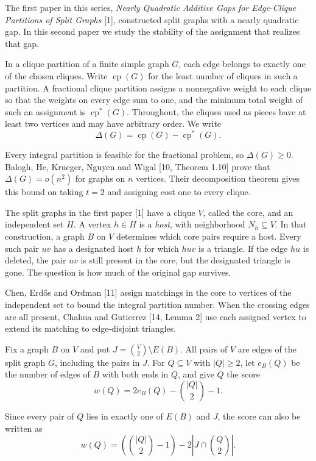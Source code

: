 \documentclass[english,11pt,a4paper]{article}
\begin{document}
The first paper in this series, \emph{Nearly Quadratic Additive Gaps for Edge-Clique Partitions of Split Graphs} {[}1{]}, constructed split graphs with a nearly quadratic gap. In this second paper we study the stability of the assignment that realizes that gap.

In a clique partition of a finite simple graph \(G\), each edge belongs to exactly one of the chosen cliques. Write \(\operatorname{cp}(G)\) for the least number of cliques in such a partition. A fractional clique partition assigns a nonnegative weight to each clique so that the weights on every edge sum to one, and the minimum total weight of such an assignment is \(\operatorname{cp}^{\ast}(G)\). Throughout, the cliques used as pieces have at least two vertices and may have arbitrary order. We write
\[
\Delta(G)=\operatorname{cp}(G)-\operatorname{cp}^{\ast}(G).
\]

Every integral partition is feasible for the fractional problem, so \(\Delta(G)\ge0\). Balogh, He, Krueger, Nguyen and Wigal {[}10, Theorem 1.10{]} prove that \(\Delta(G)=o(n^2)\) for graphs on \(n\) vertices. Their decomposition theorem gives this bound on taking \(t=2\) and assigning cost one to every clique.

The split graphs in the first paper {[}1{]} have a clique \(V\), called the core, and an independent set \(H\). A vertex \(h\in H\) is a \emph{host}, with neighborhood \(N_h\subseteq V\). In that construction, a graph \(B\) on \(V\) determines which core pairs require a host. Every such pair \(uv\) has a designated host \(h\) for which \(huv\) is a triangle. If the edge \(hu\) is deleted, the pair \(uv\) is still present in the core, but the designated triangle is gone. The question is how much of the original gap survives.

Chen, Erdős and Ordman {[}11{]} assign matchings in the core to vertices of the independent set to bound the integral partition number. When the crossing edges are all present, Chahua and Gutierrez {[}14, Lemma 2{]} use each assigned vertex to extend its matching to edge-disjoint triangles.

Fix a graph \(B\) on \(V\) and put \(J=\binom{V}{2}\setminus E(B)\). All pairs of \(V\) are edges of the split graph \(G\), including the pairs in \(J\). For \(Q\subseteq V\) with \(|Q|\ge2\), let \(e_B(Q)\) be the number of edges of \(B\) with both ends in \(Q\), and give \(Q\) the score
\[
w(Q)=2e_B(Q)-\binom{|Q|}{2}-1.
\]

Since every pair of \(Q\) lies in exactly one of \(E(B)\) and \(J\), the score can also be written as \[
w(Q)=\left(\binom{|Q|}{2}-1\right)-2\left|J\cap\binom{Q}{2}\right|.
\]
\end{document}
